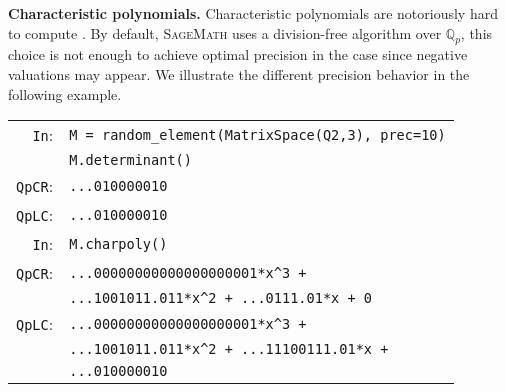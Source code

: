 \documentclass[sigconf]{acmart}
\newcommand{\Q}{\mathbb Q}
\newcommand{\Qp}{\Q_p}
\newcommand{\sage}{\textsc{SageMath}\xspace}
\newcommand{\QpCR}{\text{\color{output} \rm \tt QpCR}\xspace}
\newcommand{\cIn}{{\color{input} \tt \phantom{Zp}In}:}
\newcommand{\cZpCR}{{\color{output} \tt ZpCR}:}
\newcommand{\cZpFP}{{\color{output} \tt ZpFP}:}
\newcommand{\cZpLC}{{\color{output} \tt ZpLC}:}
\newcommand{\cZpLF}{{\color{output} \tt ZpLF}:}
\newcommand{\cQpCR}{{\color{output} \tt QpCR}:}
\newcommand{\cQpLC}{{\color{output} \tt QpLC}:}
\theoremstyle{definition}
\begin{document}
\medskip

\noindent \textbf{Characteristic polynomials.}
%
Characteristic polynomials are notoriously hard to compute 
\cite{caruso-roe-vaccon:15, caruso-roe-vaccon:17}.  By default,
\sage uses a division-free algorithm over $\Qp$, this choice is not enough to achieve optimal
precision in the \QpCR case since negative valuations may appear.  We illustrate the different
precision behavior in the following example.

\smallskip

{\noindent \small
\begin{tabular}{rl}
\cIn
 & \verb?M = ?{\color{function}\verb?random_element?}\verb?(?{\color{constructor}\verb?MatrixSpace?}\verb?(?{\color{ring}\verb?Q2?}\verb?,3), prec=10)? \\
 & \verb?M.?{\color{method}\verb?determinant?}\verb?()? \\
\cQpCR
 & \verb?...010000010? \\
\cQpLC
 & \verb?...010000010? \\
\cIn
 & \verb?M.?{\color{method}\verb?charpoly?}\verb?()? \\
\cQpCR
 & \verb?...00000000000000000001*x^3 + ? \\
 & \verb?...1001011.011*x^2 + ...0111.01*x + 0? \\
\cQpLC
 & \verb?...00000000000000000001*x^3 + ? \\
 & \verb?...1001011.011*x^2 + ...11100111.01*x +? \\
 & \verb?...010000010? \\
\end{tabular}}

\end{document}
